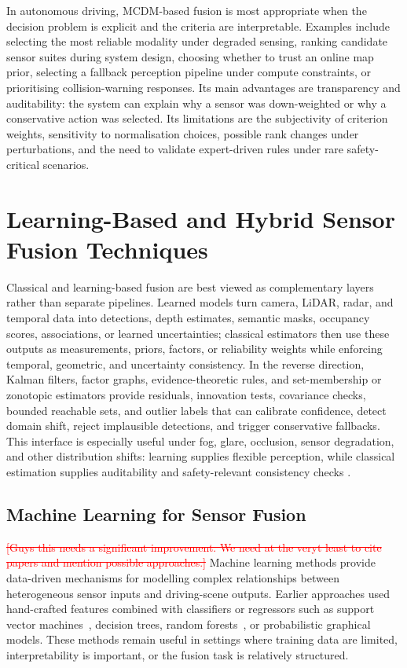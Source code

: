 \documentclass{ieeeaccess}
\newcommand{\deleted}[1]{\textcolor{red}{\sout{#1}}}
\newcommand{\addednew}[1]{\textcolor{RevisionOlive}{#1}}
\begin{document}
In autonomous driving, MCDM-based fusion is most appropriate when the decision problem is explicit and the criteria are interpretable. Examples include selecting the most reliable modality under degraded sensing, ranking candidate sensor suites during system design, choosing whether to trust an online map prior, selecting a fallback perception pipeline under compute constraints, or prioritising collision-warning responses. Its main advantages are transparency and auditability: the system can explain why a sensor was down-weighted or why a conservative action was selected. Its limitations are the subjectivity of criterion weights, sensitivity to normalisation choices, possible rank changes under perturbations, and the need to validate expert-driven rules under rare safety-critical scenarios.

\section{Learning-Based and Hybrid Sensor Fusion Techniques}
\label{sec:learning}
Classical and learning-based fusion are best viewed as complementary layers rather than separate pipelines. Learned models turn camera, LiDAR, radar, and temporal data into detections, depth estimates, semantic masks, occupancy scores, associations, or learned uncertainties; classical estimators then use these outputs as measurements, priors, factors, or reliability weights while enforcing temporal, geometric, and uncertainty consistency. In the reverse direction, Kalman filters, factor graphs, evidence-theoretic rules, and set-membership or zonotopic estimators provide residuals, innovation tests, covariance checks, bounded reachable sets, and outlier labels that can calibrate confidence, detect domain shift, reject implausible detections, and trigger conservative fallbacks. This interface is especially useful under fog, glare, occlusion, sensor degradation, and other distribution shifts: learning supplies flexible perception, while classical estimation supplies auditability and safety-relevant consistency checks \cite{khaleghi_multisensor_2013,baltrusaitis_multimodal_2019,li2022_gp_zkf}.


\subsection{Machine Learning for Sensor Fusion}
\deleted{[Guys this needs a significant improvement. We need at the veryt least to cite papers and mention possible approaches.]}
Machine learning methods provide data-driven mechanisms for modelling complex relationships between heterogeneous sensor inputs and driving-scene outputs. Earlier approaches used hand-crafted features combined with classifiers or regressors such as support vector machines\addednew{~\cite{cortes1995_svm}}, decision trees, random forests\addednew{~\cite{breiman2001_rf}}, or probabilistic graphical models. These methods remain useful in settings where training data are limited, interpretability is important, or the fusion task is relatively structured.
\end{document}
